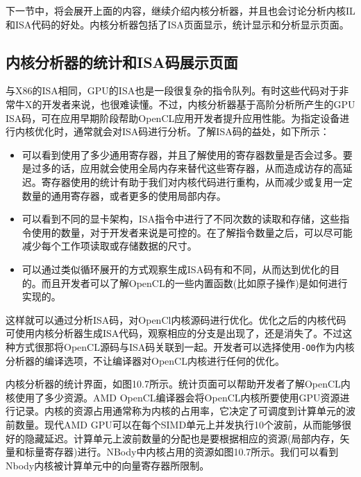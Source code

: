 

下一节中，将会展开上面的内容，继续介绍内核分析器，并且也会讨论分析内核IL和ISA代码的好处。内核分析器包括了ISA页面显示，统计显示和分析显示页面。

\subsection{内核分析器的统计和ISA码展示页面}

与X86的ISA相同，GPU的ISA也是一段很复杂的指令队列。有时这些代码对于非常牛X的开发者来说，也很难读懂。不过，内核分析器基于高阶分析所产生的GPU ISA码，可在应用早期阶段帮助OpenCL应用开发者提升应用性能。为指定设备进行内核优化时，通常就会对ISA码进行分析。了解ISA码的益处，如下所示：

\begin{itemize}
\item 可以看到使用了多少通用寄存器，并且了解使用的寄存器数量是否会过多。要是过多的话，应用就会使用全局内存来替代这些寄存器，从而造成访存的高延迟。寄存器使用的统计有助于我们对内核代码进行重构，从而减少或复用一定数量的通用寄存器，或者更多的使用局部内存。
\item 可以看到不同的显卡架构，ISA指令中进行了不同次数的读取和存储，这些指令使用的数量，对于开发者来说是可控的。在了解指令数量之后，可以尽可能减少每个工作项读取或存储数据的尺寸。
\item 可以通过类似循环展开的方式观察生成ISA码有和不同，从而达到优化的目的。而且开发者可以了解OpenCL的一些内置函数(比如原子操作)是如何进行实现的。
\end{itemize}

这样就可以通过分析ISA码，对OpenCl内核源码进行优化。优化之后的内核代码可使用内核分析器生成ISA代码，观察相应的分支是出现了，还是消失了。不过这种方式很那将OpenCL源码与ISA码关联到一起。开发者可以选择使用\texttt{-O0}作为内核分析器的编译选项，不让编译器对OpenCL内核进行任何的优化。

内核分析器的统计界面，如图10.7所示。统计页面可以帮助开发者了解OpenCL内核使用了多少资源。AMD OpenCL编译器会将OpenCL内核所要使用GPU资源进行记录。内核的资源占用通常称为内核的占用率，它决定了可调度到计算单元的波前数量。现代AMD GPU可以在每个SIMD单元上并发执行10个波前，从而能够很好的隐藏延迟。计算单元上波前数量的分配也是要根据相应的资源(局部内存，矢量和标量寄存器)进行。NBody中内核占用的资源如图10.7所示。我们可以看到Nbody内核被计算单元中的向量寄存器所限制。

